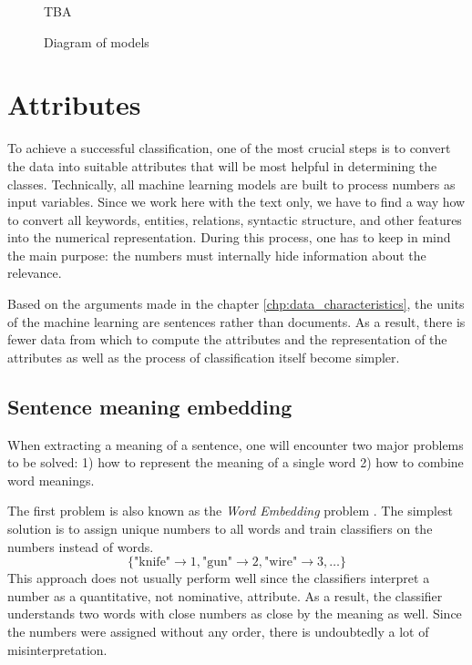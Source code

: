 \documentclass[
  digital, %
  table,   %
  lof,     %
  lot,     %
]{fithesis3}
\begin{document}

\begin{figure}[H]
\caption{Diagram of models}
\label{fig:models-diagram}
TBA
\end{figure}

\section{Attributes}
\label{sec:attributes}
To achieve a successful classification, one of the most crucial steps is to convert the data into suitable attributes that will be most helpful in determining the classes.
Technically, all machine learning models are built to process numbers as input variables.
Since we work here with the text only, we have to find a way how to convert all keywords, entities, relations, syntactic structure, and other features into the numerical representation.
During this process, one has to keep in mind the main purpose: the numbers must internally hide information about the relevance.

Based on the arguments made in the chapter \ref{chp:data_characteristics}, the units of the machine learning are sentences rather than documents.
As a result, there is fewer data from which to compute the attributes and the representation of the attributes as well as the process of classification itself become simpler.

\subsection{Sentence meaning embedding}
\label{sec:sentence-meaning}
When extracting a meaning of a sentence, one will encounter two major problems to be solved: 1) how to represent the meaning of a single word 2) how to combine word meanings.

The first problem is also known as the \textit{Word Embedding} problem \cite{wordEmbeddings}.
The simplest solution is to assign unique numbers to all words and train classifiers on the numbers instead of words.
$$
\{\text{"knife"} \rightarrow 1, \text{"gun"} \rightarrow 2, \text{"wire"} \rightarrow 3, \dots\}
$$
This approach does not usually perform well since the classifiers interpret a number as a quantitative, not nominative,  attribute.
As a result, the classifier understands two words with close numbers as close by the meaning as well.
Since the numbers were assigned without any order, there is undoubtedly a lot of misinterpretation.
\end{document}

